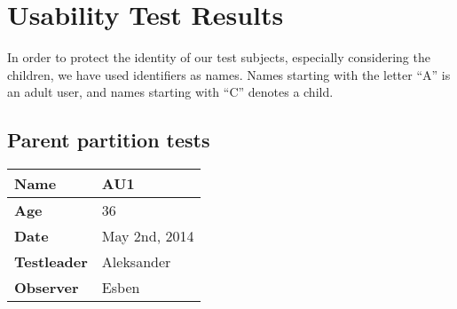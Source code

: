 \section{Usability Test Results}
\label{sec:usabilityresults}
In order to protect the identity of our test subjects, especially considering the children, we have used identifiers as names. Names starting with the letter ``A'' is an adult user, and names starting with ``C'' denotes a child.

\subsection{Parent partition tests}
\begin{table}[H]
\begin{tabular}{|p{4.0cm} | p{4.0cm} |}
	\hline
	\textbf{Name} & AU1\\
	\hline
	\textbf{Age} & 36 \\
	\hline
	\textbf{Date} & May 2nd, 2014 \\
	\hline
	\textbf{Testleader} & Aleksander\\
	\hline
	\textbf{Observer} & Esben\\
	\hline	
\end{tabular}
\end{table}

